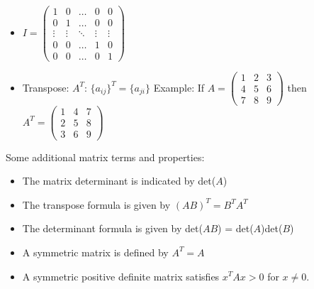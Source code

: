 \begin{itemize}
\tightlist
\item
  \(I=\left( \begin{array}{ccccc}1&0&\dots&0&0\\ 0&1&\dots&0&0\\ \vdots&\vdots & \ddots & \vdots & \vdots\\ 0& 0 & \dots& 1 & 0  \\ 0& 0 &  \dots &0& 1  \end{array}\right)\)
\item
  Transpose: \(A^T\): \(\{ a_{ij}\}^T = \{ a_{ji}\}\) Example: If \(A =
  \left( \begin{array}{ccc}1 & 2 & 3 \\ 4 & 5 & 6
  \\ 7 & 8 & 9\end{array}\right)\) then \(A^T =
  \left( \begin{array}{ccc}1 & 4 & 7 \\ 2 & 5 & 8
  \\ 3 & 6 & 9\end{array}\right)\)
\end{itemize}

Some additional matrix terms and properties:

\begin{itemize}
\tightlist
\item
  The matrix determinant is indicated by det(\(A\))
\item
  The transpose formula is given by \((AB)^T=B^TA^T\)
\item
  The determinant formula is given by det(\(AB\)) = det(\(A\))det(\(B\))
\item
  A symmetric matrix is defined by \(A^T = A\)
\item
  A symmetric positive definite matrix satisfies \(x^T A x >0\) for
  \(x \neq 0\).
\end{itemize}
